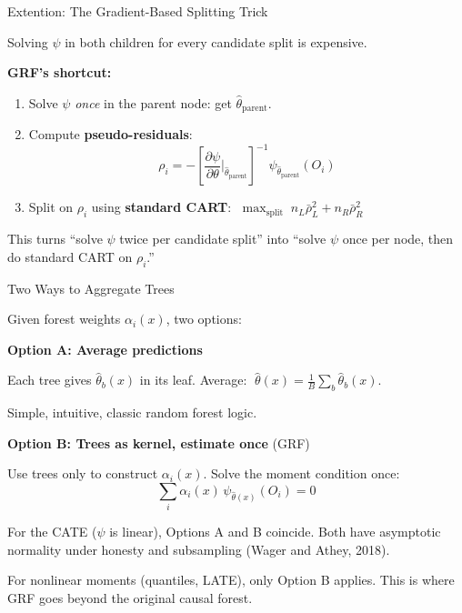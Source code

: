 \documentclass[aspectratio=169, 11pt, handout]{beamer}
\begin{document}
\begin{frame}{Extention: The Gradient-Based Splitting Trick}
 
Solving $\psi$ in both children for every candidate split is expensive.
 
\pause
\bigskip
 
\textbf{GRF's shortcut:}
 
\begin{enumerate}
    \item Solve $\psi$ \emph{once} in the parent node: get $\hat{\theta}_{\text{parent}}$.
 
    \pause
    \medskip
 
    \item Compute \textbf{pseudo-residuals}:
    \[
    \rho_i = -\left[\frac{\partial \psi}{\partial \theta}\bigg|_{\hat{\theta}_{\text{parent}}}\right]^{-1} \psi_{\hat{\theta}_{\text{parent}}}(O_i)
    \]
 
    \pause
    \medskip
 
    \item Split on $\rho_i$ using \textbf{standard CART}: $\;\max_{\text{split}}\; n_L \bar{\rho}_L^2 + n_R \bar{\rho}_R^2$
\end{enumerate}
 
\pause
\bigskip
 
This turns ``solve $\psi$ twice per candidate split'' into ``solve $\psi$ once per node, then do standard CART on $\rho_i$.''
 
\end{frame}
 
\begin{frame}{Two Ways to Aggregate Trees}
 
Given forest weights $\alpha_i(x)$, two options:
 
\bigskip
 
\textbf{Option A: Average predictions}
 
Each tree gives $\hat{\theta}_b(x)$ in its leaf. Average: $\;\hat{\theta}(x) = \frac{1}{B}\sum_{b} \hat{\theta}_b(x)$.
 
Simple, intuitive, classic random forest logic.
 
\pause
\bigskip
 
\textbf{Option B: Trees as kernel, estimate once} (GRF)
 
Use trees only to construct $\alpha_i(x)$. Solve the moment condition once:
\[
\sum_i \alpha_i(x)\, \psi_{\hat{\theta}(x)}(O_i) = 0
\]
 
\pause
\bigskip
 
For the CATE ($\psi$ is linear), Options A and B coincide. Both have asymptotic normality under honesty and subsampling (Wager and Athey, 2018).
 
\medskip
 
For nonlinear moments (quantiles, LATE), only Option B applies. This is where GRF goes beyond the original causal forest.
 
\end{frame}
 
\end{document}
